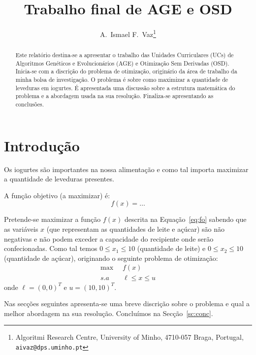 \documentclass[a4paper,12pt]{article}
\begin{document}
%
\title{Trabalho final de AGE e OSD}


\author{A.~Ismael F.~Vaz\thanks{Algoritmi Research Centre, University of Minho, 4710-057 Braga, Portugal, {\tt aivaz@dps.uminho.pt}}}

\maketitle              %
%
\begin{abstract}
Este relatório destina-se a apresentar o trabalho das Unidades Curriculares (UCs) de Algoritmos Genéticos e Evolucionários (AGE) e Otimização Sem Derivadas (OSD). Inicia-se com a discrição do problema de otimização, originário da área de trabalho da minha bolsa de investigação. O problema é sobre como maximizar a quantidade de leveduras em iogurtes. É apresentada uma discussão sobre a estrutura matemática do problema e a abordagem usada na sua resolução. Finaliza-se apresentando as conclusões.
\end{abstract}

%
%
%
\section{Introdução}

Os iogurtes são importantes na nossa alimentação e como tal importa maximizar a quantidade de leveduras presentes.

A função objetivo (a maximizar) é:
\begin{equation}\label{eq:fo}
f(x)=\dots
\end{equation}

Pretende-se maximizar a função $f(x)$ descrita na Equação~\eqref{eq:fo} sabendo que as variáveis $x$ (que representam as quantidades de leite e açúcar) são não negativas e não podem exceder a capacidade do recipiente onde serão confecionadas. Como tal temos $0\leq x_1\leq 10$ (quantidade de leite) e $0\leq x_2\leq 10$ (quantidade de açúcar), originando o seguinte problema de otimização:
\begin{equation}\label{eq:prob}
\begin{split}
\max\;\; &f(x)\\
s.a\;\; & \ell\leq x\leq u
\end{split}
\end{equation}
onde $\ell=(0,0)^T$ e $u=(10,10)^T$.

Nas secções seguintes apresenta-se uma breve discrição sobre o problema e qual a melhor abordagem na sua resolução. Concluímos na Secção~\ref{sc:conc}.
\end{document}
